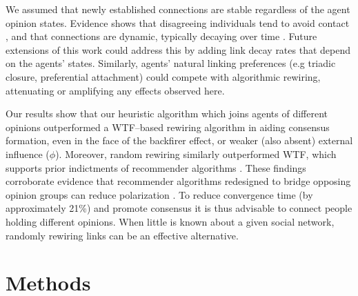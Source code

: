 \documentclass[unnumsec,webpdf,contemporary,large]{oup-authoring-template}%
\theoremstyle{thmstyleone}%
\theoremstyle{thmstyletwo}%
\theoremstyle{thmstylethree}%
\begin{document}
We assumed that newly established connections are stable regardless of the agent opinion states. Evidence shows that disagreeing individuals tend to avoid contact \citep{dunbar_anatomy_2018}, and that connections are dynamic, typically decaying over time \cite{roberts_costs_2011}. Future extensions of this work could address this by adding link decay rates that depend on the agents' states. Similarly, agents' natural linking preferences (e.g triadic closure, preferential attachment) could compete with algorithmic rewiring, attenuating or amplifying any effects observed here.

Our results show that our heuristic algorithm which joins agents of different opinions outperformed a WTF--based rewiring algorithm in aiding consensus formation, even in the face of the backfirer effect, or weaker (also absent) external influence ($\phi$). Moreover, random rewiring similarly outperformed WTF, which supports prior indictments of recommender algorithms  \cite{espin-noboa_inequality_2022, lasser_designing_2025}. These findings corroborate evidence that  recommender algorithms redesigned to bridge opposing opinion groups can reduce polarization \citep{santos_link_2021, pappalardo_survey_2024}. To reduce convergence time (by approximately 21\%) and promote consensus it is thus advisable to connect people holding different opinions. When little is known about a given social network, randomly rewiring links can be an effective alternative.

\section{Methods}\label{sec:methods}
\end{document}
